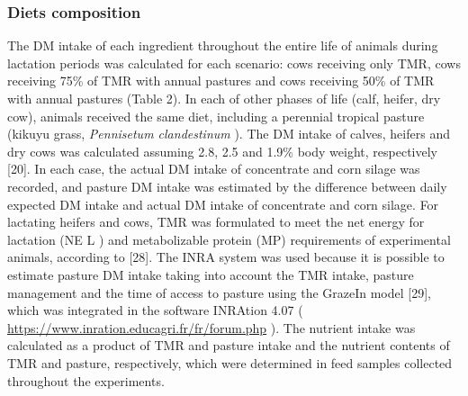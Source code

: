 \documentclass[11pt,a4paper]{article}
\begin{document}
\subsubsection{Diets composition}

The DM intake of each ingredient throughout the entire life of animals during lactation periods was calculated for each scenario: cows receiving only TMR, cows receiving 75\% of TMR with annual pastures and cows receiving 50\% of TMR with annual pastures (Table 2). In each of other phases of life (calf, heifer, dry cow), animals received the same diet, including a perennial tropical pasture (kikuyu grass, \textit{Pennisetum clandestinum} ). The DM intake of calves, heifers and dry cows was calculated assuming 2.8, 2.5 and 1.9\% body weight, respectively [20]. In each case, the actual DM intake of concentrate and corn silage was recorded, and pasture DM intake was estimated by the difference between daily expected DM intake and actual DM intake of concentrate and corn silage. For lactating heifers and cows, TMR was formulated to meet the net energy for lactation (NE L ) and metabolizable protein (MP) requirements of experimental animals, according to [28]. The INRA system was used because it is possible to estimate pasture DM intake taking into account the TMR intake, pasture management and the time of access to pasture using the GrazeIn model [29], which was integrated in the software INRAtion 4.07 ( \href{https://www.inration.educagri.fr/fr/forum.php}{https://www.inration.educagri.fr/fr/forum.php} ). The nutrient intake was calculated as a product of TMR and pasture intake and the nutrient contents of TMR and pasture, respectively, which were determined in feed samples collected throughout the experiments.
\end{document}
